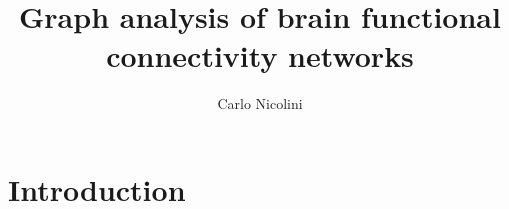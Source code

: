 %


\title{Graph analysis of brain functional connectivity networks}
\author{Carlo Nicolini}


\maketitle
{}

%

%


%



\chapter{Introduction}\label{chap:introduction}
	

% 	

% 	

% 	

% 	





% 	

